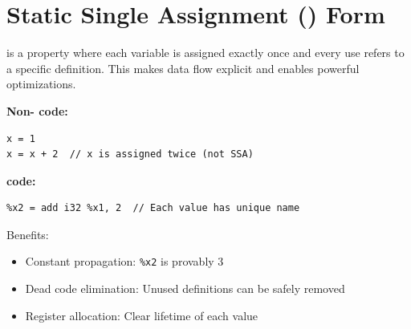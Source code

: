 \section{Static Single Assignment () Form}

 is a property where each variable is assigned exactly once and every use refers to a specific definition. This makes data flow explicit and enables powerful optimizations.

\textbf{Non- code:}
\begin{lstlisting}[style=ir]
x = 1
x = x + 2  // x is assigned twice (not SSA)
\end{lstlisting}

\textbf{ code:}
\begin{lstlisting}[style=ir]
%x1 = 1
%x2 = add i32 %x1, 2  // Each value has unique name
\end{lstlisting}

Benefits:
\begin{itemize}[noitemsep]
  \item Constant propagation: \texttt{\%x2} is provably 3
  \item Dead code elimination: Unused definitions can be safely removed
  \item Register allocation: Clear lifetime of each value
\end{itemize}

